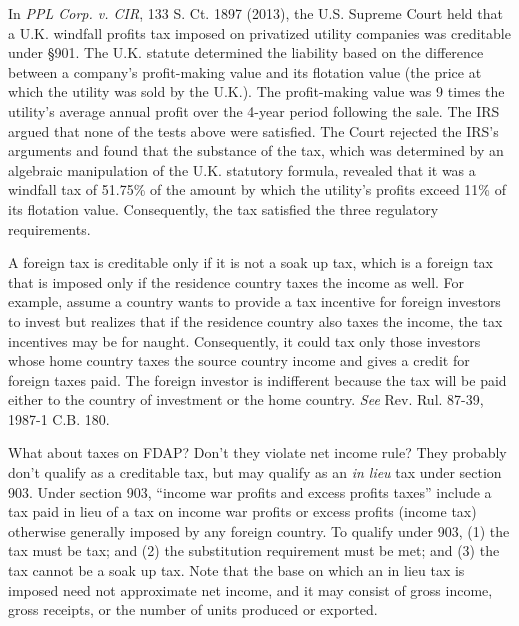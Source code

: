 In \emph{PPL Corp. v. CIR}, 133 S. Ct. 1897 (2013), the U.S. Supreme Court held that a U.K. windfall profits tax imposed on privatized utility companies was creditable under \S901.  The U.K. statute determined the liability based on the difference between a company's profit-making value and its flotation value (the price at which the utility was sold by the U.K.).  The profit-making value was 9 times the utility's average annual profit over the 4-year period following the sale.  The IRS argued that none of the tests above were satisfied.  The Court rejected the IRS's arguments and found that the substance of the tax, which was determined by an algebraic manipulation of the U.K. statutory formula, revealed that it was a windfall tax of 51.75\% of the amount by which the utility's profits exceed 11\% of its flotation value.  Consequently, the tax satisfied the three regulatory requirements.   

A foreign tax is creditable only if it is not a soak up tax, which is a foreign tax that is imposed only if the residence country taxes the income as well.  For example, assume a country wants to provide a tax incentive for foreign investors to invest but realizes that if the residence country also taxes the income, the tax incentives may be for naught.  Consequently, it could tax only those investors whose home country taxes the source country income and gives a credit for foreign taxes paid.  The foreign investor is indifferent because the tax will be paid either to the country of investment or the home country.  \emph{See} Rev. Rul. 87-39, 1987-1 C.B. 180.

What about taxes on FDAP?  Don't they violate net income rule?  They probably don't qualify as a creditable tax, but may qualify as an \emph{in lieu} tax under section 903.  Under section 903, ``income war profits and excess profits taxes'' include a tax paid in lieu of a tax on income war profits or excess profits (income tax) otherwise generally imposed by any foreign country.   To qualify under 903, (1) the tax must be tax; and (2) the substitution requirement must be met; and (3) the tax cannot be a soak up tax.  Note that the base on which an in lieu tax is imposed need not approximate net income, and it may consist of gross income, gross receipts, or the number of units produced or exported.   
  
